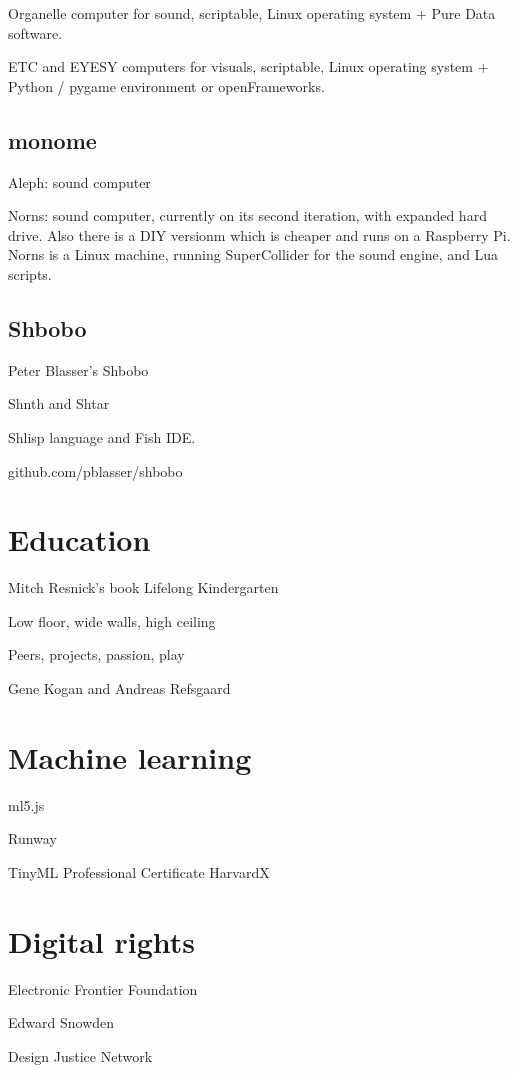 Organelle computer for sound, scriptable, Linux operating system + Pure Data software.

ETC and EYESY computers for visuals, scriptable, Linux operating system + Python / pygame environment or openFrameworks.

\subsection{monome}

Aleph: sound computer

Norns: sound computer, currently on its second iteration, with expanded hard drive. Also there is a DIY versionm which is cheaper and runs on a Raspberry Pi.
Norns is a Linux machine, running SuperCollider for the sound engine, and Lua scripts.

\subsection{Shbobo}

Peter Blasser's Shbobo

Shnth and Shtar

Shlisp language and Fish IDE.

github.com/pblasser/shbobo

\section{Education}

Mitch Resnick's book Lifelong Kindergarten

Low floor, wide walls, high ceiling

Peers, projects, passion, play

Gene Kogan and Andreas Refsgaard

\section{Machine learning}

ml5.js

Runway

TinyML Professional Certificate HarvardX

\section{Digital rights}

Electronic Frontier Foundation

Edward Snowden

Design Justice Network
